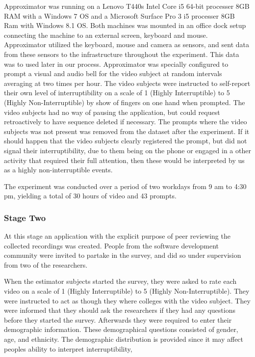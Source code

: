 \documentclass{sigchi}
\begin{document}
Approximator was running on a Lenovo T440s Intel Core i5 64-bit processer 8GB RAM with a Windows 7 OS and a Microsoft Surface Pro 3 i5 processer 8GB Ram with Windows 8.1 OS.
Both machines was mounted in an office dock setup connecting the machine to an external screen, keyboard and mouse.
Approximator utilized the keyboard, mouse and camera as sensors, and sent data from these sensors to the infrastructure throughout the experiment.
This data was to used later in our process.
Approximator was specially configured to prompt a visual and audio bell for the video subject at random intervals averaging at two times per hour.
The video subjects were instructed to self-report their own level of interruptibility on a scale of 1 (Highly Interruptible) to 5 (Highly Non-Interruptible) by show of fingers on one hand when prompted.
The video subjects had no way of pausing the application, but could request retroactively to have sequence deleted if necessary.
The prompts where the video subjects was not present was removed from the dataset after the experiment.
If it should happen that the video subjects clearly registered the prompt, but did not signal their interruptibility, due to them being on the phone or engaged in a other activity that required their full attention, then these would be interpreted by us as a highly non-interruptible events.

The experiment was conducted over a period of two workdays from 9 am to 4:30 pm, yielding a total of 30 hours of video and 43 prompts.

\subsubsection{Stage Two}
\label{stage_two}
At this stage an application with the explicit purpose of peer reviewing the collected recordings was created.
People from the software development community were invited to partake in the survey, and did so under supervision from two of the researchers.

When the estimator subjects started the survey, they were asked to rate each video on a scale of 1 (Highly Interruptible) to 5 (Highly Non-Interruptible).
They were instructed to act as though they where colleges with the video subject.
They were informed that they should ask the researchers if they had any questions before they started the survey.
Afterwards they were required to enter their demographic information.
These demographical questions consisted of gender, age, and ethnicity.
The demographic distribution is provided since it may affect peoples ability to interpret interruptibility,
\end{document}
